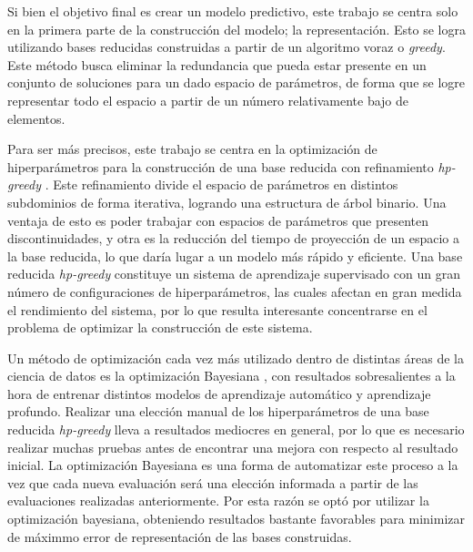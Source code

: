 Si bien el objetivo final es crear un modelo predictivo, este trabajo se centra solo en la primera parte de la construcción del modelo; la representación. Esto se logra utilizando bases reducidas \cite{rb0book, doi:10.1137/09075250X, PhysRevLett.106.221102, 10.1115/1.1448332, rb1book} construidas a partir de un algoritmo voraz o \textit{greedy}. Este método busca eliminar la redundancia que pueda estar presente en un conjunto de soluciones para un dado espacio de parámetros, de forma que se logre representar todo el espacio a partir de un número relativamente bajo de elementos.

Para ser más precisos, este trabajo se centra en la optimización de hiperparámetros para la construcción de una base reducida con refinamiento \textit{hp-greedy} \cite{Cerino:2022dhr}. Este refinamiento divide el espacio de parámetros en distintos subdominios de forma iterativa, logrando una estructura de árbol binario. Una ventaja de esto es poder trabajar con espacios de parámetros que presenten discontinuidades, y otra es la reducción del tiempo de proyección de un espacio a la base reducida, lo que daría lugar a un modelo más rápido y eficiente. Una base reducida \textit{hp-greedy} constituye un sistema de aprendizaje supervisado con un gran número de configuraciones de hiperparámetros, las cuales afectan en gran medida el rendimiento del sistema, por lo que resulta interesante concentrarse en el problema de optimizar la construcción de este sistema. 

Un método de optimización cada vez más utilizado dentro de distintas áreas de la ciencia de datos es la optimización Bayesiana \cite{7352306, https://doi.org/10.48550/arxiv.1012.2599}, con resultados sobresalientes a la hora de entrenar distintos modelos de aprendizaje automático y aprendizaje profundo. 
Realizar una elección manual de los hiperparámetros de una base reducida \textit{hp-greedy} lleva a resultados mediocres en general, por lo que es necesario realizar muchas pruebas antes de encontrar una mejora con respecto al resultado inicial. La optimización Bayesiana es una forma de automatizar este proceso a la vez que cada nueva evaluación será una elección informada a partir de las evaluaciones realizadas anteriormente. Por esta razón se optó por utilizar la optimización bayesiana, obteniendo resultados bastante favorables para minimizar de máximmo error de representación de las bases construidas.












